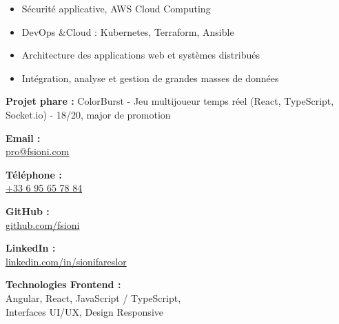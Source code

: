 \documentclass[a4paper,11pt]{article}
\begin{document}
\begin{cv}[profile][2]
\begin{cvevent}[2023][2025]
    \begin{itemize}
        \item Sécurité applicative, AWS Cloud Computing
        \item DevOps \&Cloud : Kubernetes, Terraform, Ansible
        \item Architecture des applications web et systèmes distribués
        \item Intégration, analyse et gestion de grandes masses de données
    \end{itemize}
\end{cvevent}

\begin{cvevent}[2019][2023]
    \textbf{Projet phare :} ColorBurst - Jeu multijoueur temps réel (React, TypeScript, Socket.io) - 18/20, major de promotion
\end{cvevent}

\cvsidebar

\begin{cvitem}[Envelope][4]
    \textbf{Email :}\\
    \href{mailto:pro@fsioni.com}{pro@fsioni.com}
\end{cvitem}

\cvseparator[3]
\begin{cvitem}[Phone][4]
    \textbf{ Téléphone :}\\
    \href{tel:+33695657884}
    {+33 6 95 65 78 84}
\end{cvitem}

\cvseparator[3]
\begin{cvitem}[Github][4]
    \textbf{ GitHub :}\\
    \href{https://github.com/fsioni}{github.com/fsioni}
\end{cvitem}

\cvseparator[3]
\begin{cvitem}[Linkedin][4]
    \textbf{ LinkedIn :}\\
    \href{https://linkedin.com/in/sionifareslor}{linkedin.com/in/sionifareslor}
\end{cvitem}

    \begin{cvitem}
        \textbf{Technologies Frontend :} \\
        Angular, React, JavaScript / TypeScript, \\
        Interfaces UI/UX, Design Responsive
    \end{cvitem}


\end{cv}
\end{document}
